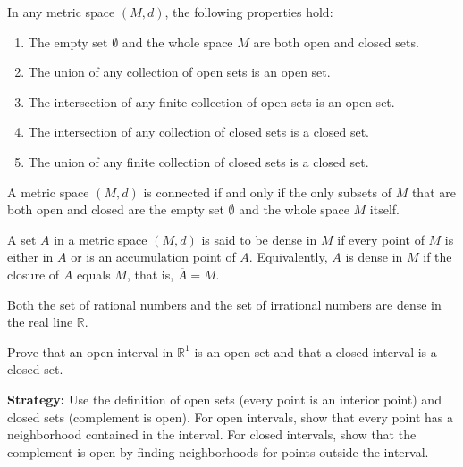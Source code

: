\begin{theorem}
In any metric space $(M,d)$, the following properties hold:
\begin{enumerate}
\item The empty set $\emptyset$ and the whole space $M$ are both open and closed sets.
\item The union of any collection of open sets is an open set.
\item The intersection of any finite collection of open sets is an open set.
\item The intersection of any collection of closed sets is a closed set.
\item The union of any finite collection of closed sets is a closed set.
\end{enumerate}
\end{theorem}

\begin{theorem}
A metric space $(M,d)$ is connected if and only if the only subsets of $M$ that are both open and closed are the empty set $\emptyset$ and the whole space $M$ itself.
\end{theorem}

\begin{definition}
A set $A$ in a metric space $(M,d)$ is said to be dense in $M$ if every point of $M$ is either in $A$ or is an accumulation point of $A$. Equivalently, $A$ is dense in $M$ if the closure of $A$ equals $M$, that is, $\overline{A} = M$.
\end{definition}

\begin{theorem}
Both the set of rational numbers and the set of irrational numbers are dense in the real line $\mathbb{R}$.
\end{theorem}



\begin{problembox}
Prove that an open interval in $\mathbb{R}^1$ is an open set and that a closed interval is a closed set.
\end{problembox}

\noindent\textbf{Strategy:} Use the definition of open sets (every point is an interior point) and closed sets (complement is open). For open intervals, show that every point has a neighborhood contained in the interval. For closed intervals, show that the complement is open by finding neighborhoods for points outside the interval.

